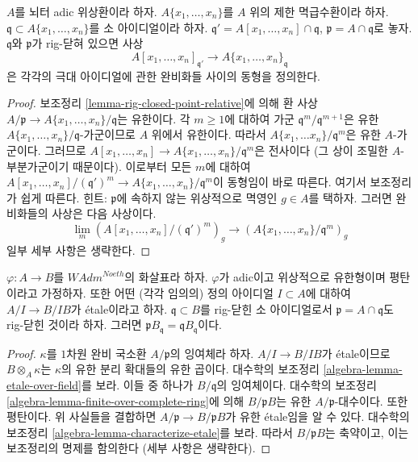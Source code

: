 \begin{lemma}
\label{lemma-rig-closed-point-variables}
$A$를 뇌터 adic 위상환이라 하자.
$A\{x_1, \ldots, x_n\}$를 $A$ 위의 제한 멱급수환이라 하자.
$\mathfrak q \subset A\{x_1, \ldots, x_n\}$를 소 아이디얼이라 하자.
$\mathfrak q' = A[x_1, \ldots, x_n] \cap \mathfrak q$,
$\mathfrak p = A \cap \mathfrak q$로 놓자.
$\mathfrak q$와 $\mathfrak p$가 rig-닫혀 있으면 사상
$$
A[x_1, \ldots, x_n]_{\mathfrak q'}
\to
A\{x_1, \ldots, x_n\}_\mathfrak q
$$
은 각각의 극대 아이디얼에 관한 완비화들 사이의 동형을 정의한다.
\end{lemma}

\begin{proof}
보조정리 \ref{lemma-rig-closed-point-relative}에 의해 환 사상
$A/\mathfrak p \to A\{x_1, \ldots, x_n\}/\mathfrak q$는 유한이다.
각 $m \geq 1$에 대하여 가군 $\mathfrak q^m/\mathfrak q^{m + 1}$은
유한 $A\{x_1, \ldots, x_n\}/\mathfrak q$-가군이므로 $A$ 위에서 유한이다.
따라서 $A\{x_1, \ldots x_n\}/\mathfrak q^m$은 유한 $A$-가군이다.
그러므로 $A[x_1, \ldots, x_n] \to
A\{x_1, \ldots, x_n\}/\mathfrak q^m$은 전사이다
(그 상이 조밀한 $A$-부분가군이기 때문이다).
이로부터 모든 $m$에 대하여
$A[x_1, \ldots, x_n]/(\mathfrak q')^m \to
A\{x_1, \ldots, x_n\}/\mathfrak q^m$이 동형임이 바로 따른다.
여기서 보조정리가 쉽게 따른다. 힌트: $\mathfrak p$에 속하지 않는
위상적으로 멱영인 $g \in A$를 택하자. 그러면 완비화들의 사상은 다음 사상이다.
$$
\lim_m \left(A[x_1, \ldots, x_n]/(\mathfrak q')^m\right)_g
\longrightarrow
\left(A\{x_1, \ldots, x_n\}/\mathfrak q^m\right)_g
$$
일부 세부 사항은 생략한다.
\end{proof}

\begin{lemma}
\label{lemma-rig-closed-point-etale}
$\varphi : A \to B$를 $\textit{WAdm}^{Noeth}$의 화살표라 하자.
$\varphi$가 adic이고 위상적으로 유한형이며 평탄이라고 가정하자.
또한 어떤 (각각 임의의) 정의 아이디얼 $I \subset A$에 대하여
$A/I \to B/IB$가 \'etale이라고 하자.
$\mathfrak q \subset B$를 rig-닫힌 소 아이디얼로서
$\mathfrak p = A \cap \mathfrak q$도 rig-닫힌 것이라 하자.
그러면 $\mathfrak p B_\mathfrak q = \mathfrak q B_\mathfrak q$이다.
\end{lemma}

\begin{proof}
$\kappa$를 $1$차원 완비 국소환 $A/\mathfrak p$의 잉여체라 하자.
$A/I \to B/IB$가 \'etale이므로 $B \otimes_A \kappa$는
$\kappa$의 유한 분리 확대들의 유한 곱이다.
대수학의 보조정리 \ref{algebra-lemma-etale-over-field}를 보라.
이들 중 하나가 $B/\mathfrak q$의 잉여체이다.
대수학의 보조정리 \ref{algebra-lemma-finite-over-complete-ring}에 의해
$B/\mathfrak p B$는 유한 $A/\mathfrak p$-대수이다. 또한 평탄이다.
위 사실들을 결합하면 $A/\mathfrak p \to B /\mathfrak p B$가
유한 \'etale임을 알 수 있다. 대수학의 보조정리
\ref{algebra-lemma-characterize-etale}를 보라.
따라서 $B/\mathfrak p B$는 축약이고, 이는 보조정리의 명제를 함의한다
(세부 사항은 생략한다).
\end{proof}

